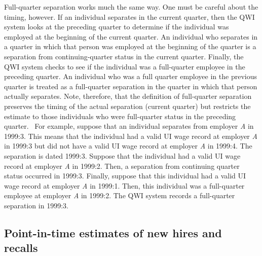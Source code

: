 Full-quarter separation works much the same way. One must be careful about
the timing, however. If an individual separates in the current quarter, then
the QWI system looks at the preceding quarter to determine if the individual
was employed at the beginning of the current quarter. An individual who
separates in a quarter in which that person was employed at the beginning of
the quarter is a separation from continuing-quarter status in the current
quarter. Finally, the QWI system checks to see if the individual was a
full-quarter employee in the preceding quarter. An individual who was a full
quarter employee in the previous quarter is treated as a full-quarter
separation in the quarter in which that person actually separates. Note,
therefore, that the definition of full-quarter separation preserves the
timing of the actual separation (current quarter) but restricts the estimate
to those individuals who were full-quarter status in the preceding quarter.
\ For example, suppose that an individual separates from employer \textit{A}
in 1999:3. This means that the individual had a valid {UI} wage record at
employer \textit{A} in 1999:3 but did not have a valid {UI} wage record at
employer \textit{A} in 1999:4. The separation is dated 1999:3. Suppose that
the individual had a valid {UI} wage record at employer \textit{A} in
1999:2. Then, a separation from continuing quarter status occurred in
1999:3. Finally, suppose that this individual had a valid {UI} wage record
at employer \textit{A} in 1999:1. Then, this individual was a full-quarter
employee at employer \textit{A} in 1999:2. The QWI system records a
full-quarter separation in 1999:3.

\subsection{Point-in-time estimates of new hires and recalls}

 

